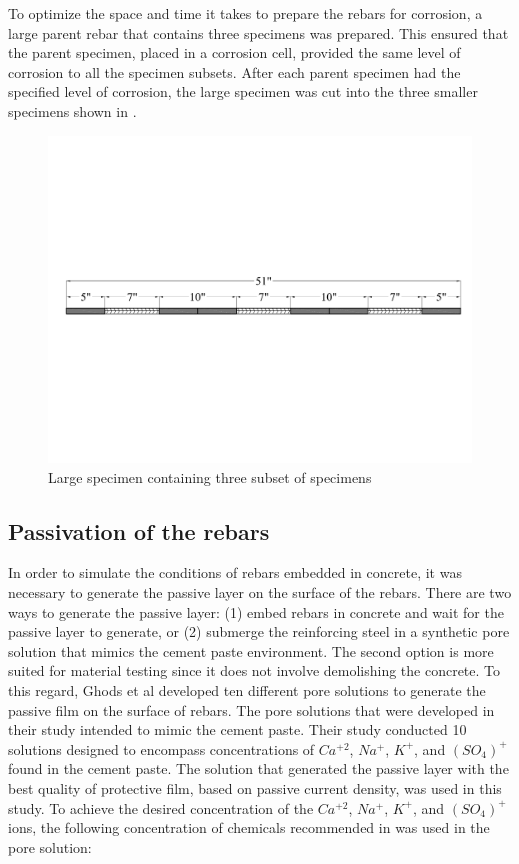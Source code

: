 To optimize the space and time it takes to prepare the rebars for corrosion, a large parent rebar that contains three specimens was prepared. This ensured that the parent specimen, placed in a corrosion cell, provided the same level of corrosion to all the specimen subsets. After each parent specimen had the specified level of corrosion, the large specimen was cut into the three smaller specimens shown in .

\begin{figure}[htbp]
	\centering
	\includegraphics[width=1.0\textwidth]{Chapter-3/figs/LargeSpecimen}
	\caption{Large specimen containing three subset of specimens}
	\label{fig:LargeSpecimen}
\end{figure}

\newpage

\subsection{Passivation of the rebars}

In order to simulate the conditions of rebars embedded in concrete, it was necessary to generate the passive layer on the surface of the rebars. There are two ways to generate the passive layer: (1) embed rebars in concrete and wait for the passive layer to generate, or (2) submerge the reinforcing steel in a synthetic pore solution that mimics the cement paste environment. The second option is more suited for material testing since it does not involve demolishing the concrete. To this regard, Ghods et al \cite{Ghods2010} developed ten different pore solutions to generate the passive film on the surface of rebars. The pore solutions that were developed in their study intended to mimic the cement paste. Their study conducted 10 solutions designed to encompass concentrations of $Ca^{+2}$, $Na^{+}$, $K^{+}$, and $(SO_{4})^{+}$ found in the cement paste. The solution that generated the passive layer with the best quality of protective film, based on passive current density, was used in this study. To achieve the desired concentration of the $Ca^{+2}$, $Na^{+}$, $K^{+}$, and $(SO_{4})^{+}$ ions, the following concentration of chemicals recommended in \cite{Ghods2010} was used in the pore solution:


